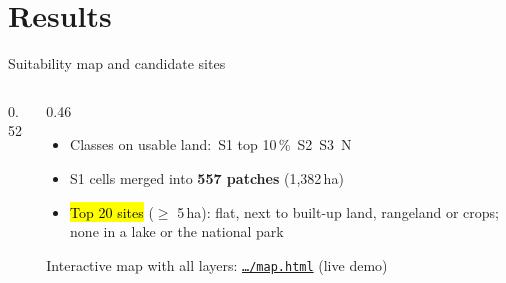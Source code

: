 \documentclass[aspectratio=169,11pt,t]{beamer}
\newcommand{\siteurl}{https://iamabhinav-dev.github.io/gis-urban-suitability/}
\begin{document}
\section{Results}

\begin{frame}{Suitability map and candidate sites}
  \begin{columns}[T]
    \begin{column}{0.52\textwidth}
      \centering{}
    \end{column}
    \begin{column}{0.46\textwidth}
      \footnotesize
      \setlength{\fboxsep}{5pt}\setlength{\fboxrule}{0.5pt}%
      \vspace{6pt}
      \begin{itemize}
        \item Classes on usable land:
              \,S1 top 10\,\% \;\,S2 \;\,S3
              \;\,N
        \item S1 cells merged into \textbf{557 patches} (1,382\,ha)
        \item \hl{Top 20 sites} ($\geq$ 5\,ha): flat, next to built-up land, rangeland or
              crops; none in a lake or the national park
      \end{itemize}
      \vspace{3pt}
      Interactive map with all layers:
      \href{\siteurl map.html}{\texttt{\dots/map.html}} (live demo)
    \end{column}
  \end{columns}
\end{frame}
\end{document}

